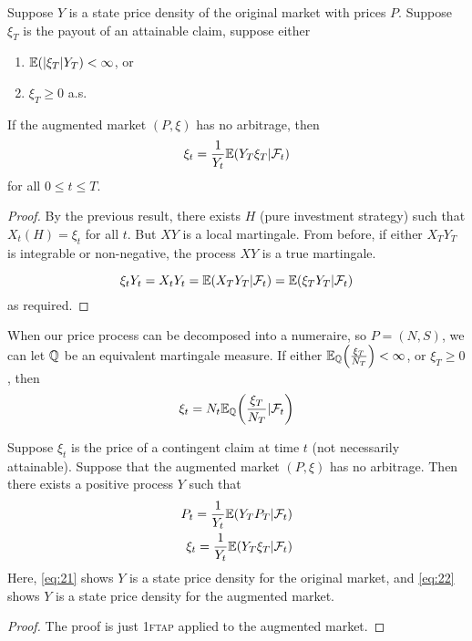 \begin{thm}
  \label{defn:discrete_time_models:22}
  Suppose $Y$ is a state price density of the original market with
  prices $P$.  Suppose $\xi_{T}$ is the payout of an attainable claim,
  suppose either
  \begin{enumerate}
  \item $\E{|\xi_{T}|Y_{T}} < \infty$, or
  \item $\xi_{T} \geq 0$ a.s.
  \end{enumerate}

  If the augmented market $(P, \xi)$ has no arbitrage, then
  \begin{equation}
    \label{eq:18}
    \xi_{t} = \frac{1}{Y_{t}} \E{Y_{T} \xi_{T} | \mathcal{F}_{t}}
  \end{equation} for all $0 \leq t \leq T$.
\end{thm}

\begin{proof}
  By the previous result, there exists $H$ (pure investment strategy)
  such that $X_{t}(H) = \xi_{t}$ for all $t$.  But $XY$ is a local
  martingale.  From before, if either $X_{T} Y_{T}$ is integrable or
  non-negative, the process $XY$ is a true martingale.

  \begin{equation}
    \label{eq:19}
    \xi_{t} Y_{t} = X_{t} Y_{t} = \E{X_{T} Y_{T} | \mathcal{F}_{t}} =
    \E{\xi_{T} Y_{T} | \mathcal{F}_{t}}
  \end{equation} as required.
\end{proof}

\begin{remark}
  When our price process can be decomposed into a numeraire, so $P =
  (N, S)$, we can let $\mathbb{Q}$ be an equivalent martingale measure.  If
  either $\E{\frac{\xi_{T}}{N_{T}}}{\Q} < \infty$, or $\xi_{T} \geq 0$,
  then
  \begin{equation}
    \label{eq:20}
    \xi_{t} = N_{t} \E{\frac{\xi_{T}}{N_{T}} | \mathcal{F}_{t}}{\Q}
  \end{equation}
\end{remark}

\begin{thm}
  \label{defn:discrete_time_models:23}
  Suppose $\xi_{t}$ is the price of a contingent claim at time $t$
  (not necessarily attainable).  Suppose that the augmented market
  $(P, \xi)$ has no arbitrage.  Then there exists a positive process
  $Y$ such that
  \begin{align}
    \label{eq:21}
    P_{t} = \frac{1}{Y_{t}} \E{Y_{T} P_{T} | \mathcal{F}_{t}} \\
    \label{eq:22}
    \xi_{t} = \frac{1}{Y_{t}} \E{Y_{T} \xi_{T} | \mathcal{F}_{t}}
  \end{align}
  Here, \eqref{eq:21} shows $Y$ is a state price density for the original
  market, and \eqref{eq:22} shows $Y$ is a state price density for the
  augmented market.
\end{thm}

\begin{proof}
  The proof is just \textsc{1ftap} applied to the augmented market.
\end{proof}

